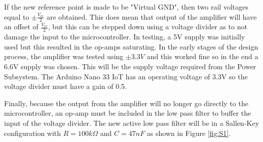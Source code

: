\documentclass[class=report,11pt,crop=false]{standalone}
\begin{document}
	If the new reference point is made to be "Virtual GND", then two rail voltages equal to $\pm \frac{V_{cc}}{2}$ are obtained. This does mean that output of the amplifier will have an offset of $\frac{V_{cc}}{2}$, but this can be stepped down using a voltage divider as to not damage the input to the microcontroller. In testing, a 5V supply was initially used but this resulted in the op-amps saturating. In the early stages of the design process, the amplifier was tested using $\pm3.3V$ and this worked fine so in the end a 6.6V supply was chosen. This will be the supply voltage required from the Power Subsystem. The Arduino Nano 33 IoT has an operating voltage of 3.3V so the voltage divider must have a gain of 0.5.
	
	Finally, because the output from the amplifier will no longer go directly to the microcontroller, an op-amp must be included in the low pass filter to buffer the input of the voltage divider. The new active low pass filter will be in a Sallen-Key configuration with $R = 100k\Omega$ and $C = 47nF$ as shown in Figure \ref{fig:S1}.
	
\end{document}
